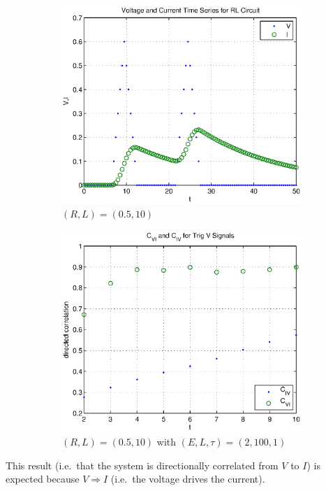 \documentclass[a4paper,11pt]{article}
\begin{document}
\begin{figure}[h!t]
\centering
\begin{subfigure}[b]{0.4\textwidth}
\label{fig:RL_trigsignals}
\includegraphics[scale=0.55]{graphics/RL_trigsignals.eps}
\caption{$(R,L) = (0.5,10)$}
\end{subfigure}
\begin{subfigure}[b]{0.4\textwidth}
\label{fig:RL_trigsignalsCCM}
\includegraphics[scale=0.55]{graphics/RL_trigsignalsCCM.eps}
\caption{$(R,L) = (0.5,10)$ with $\left(E,L,\tau\right)=\left(2,100,1\right)$}
\end{subfigure}
\caption{}
\end{figure}
This result (i.e.\ that the system is directionally correlated from $V$ to $I$) is expected because $V\Rightarrow I$ (i.e.\ the voltage drives the current).
\end{document}
